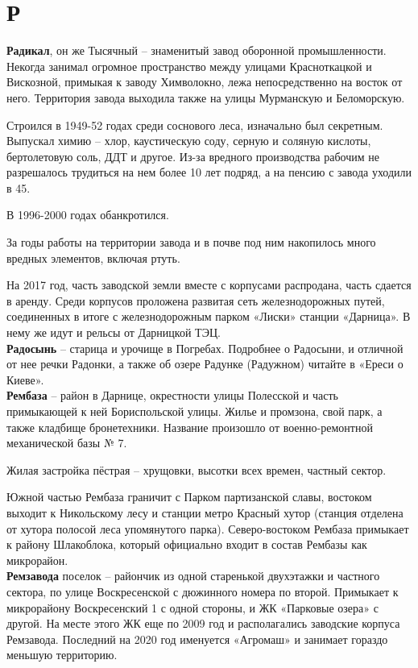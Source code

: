 \chapter*{Р}

\textbf{Радикал}, он же Тысячный – знаменитый завод оборонной промышленности. Некогда занимал огромное пространство между улицами Красноткацкой и Вискозной, примыкая к заводу Химволокно, лежа непосредственно на восток от него. Территория завода выходила также на улицы Мурманскую и Беломорскую.

Строился в 1949-52 годах среди соснового леса, изначально был секретным. Выпускал химию –  хлор, каустическую соду, серную и соляную кислоты, бертолетовую соль, ДДТ и другое. Из-за вредного производства рабочим не разрешалось трудиться на нем более 10 лет подряд, а на пенсию с завода уходили в 45.

В 1996-2000 годах обанкротился.

За годы работы на территории завода и в почве под ним накопилось много вредных элементов, включая ртуть.

На 2017 год, часть заводской земли вместе с корпусами распродана, часть сдается в аренду. Среди корпусов проложена развитая сеть железнодорожных путей, соединенных в итоге с железнодорожным парком «Лиски» станции «Дарница». В нему же идут и рельсы от Дарницкой ТЭЦ.\\

\textbf{Радосынь} – старица и урочище в Погребах. Подробнее о Радосыни, и отличной от нее речки Радонки, а также об озере Радунке (Радужном) читайте в «Ереси о Киеве».\\

\textbf{Рембаза} – район в Дарнице, окрестности улицы Полесской и часть примыкающей к ней Бориспольской улицы. Жилье и промзона, свой парк, а также кладбище бронетехники. Название произошло от военно-ремонтной механической         базы № 7.

Жилая застройка пёстрая – хрущовки, высотки всех времен, частный сектор.

Южной частью Рембаза граничит с Парком партизанской славы, востоком выходит к Никольскому лесу и станции метро Красный хутор (станция отделена от хутора полосой леса упомянутого парка). Северо-востоком Рембаза примыкает к району Шлакоблока, который официально входит в состав Рембазы как микрорайон.\\

\textbf{Ремзавода} поселок – райончик из одной старенькой двухэтажки и частного сектора, по улице Воскресенской с дюжинного номера по второй. Примыкает к микрорайону Воскресенский 1 с одной стороны, и ЖК «Парковые озера» с другой. На месте этого ЖК еще по 2009 год и располагались заводские корпуса Ремзавода. Последний на 2020 год именуется «Агромаш» и занимает гораздо меньшую территорию.

